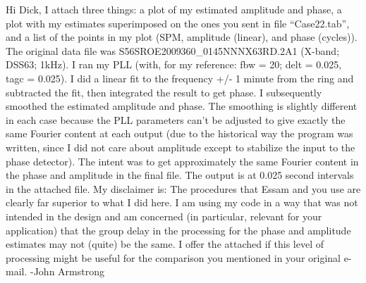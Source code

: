 \documentclass[crop=false,class=article,oneside]{standalone}
\begin{document}
Hi Dick, I attach three things:  a plot of my estimated amplitude and phase, a plot with my estimates superimposed on the ones you sent in file “Case22.tab”, and a list of the points in my plot (SPM, amplitude (linear), and phase (cycles)).  The original data file was S56SROE2009360\_0145NNNX63RD.2A1 (X-band; DSS63; 1kHz). I ran my PLL (with, for my reference: fbw = 20; delt = 0.025, tagc = 0.025). I did a linear fit to the frequency +/- 1 minute from the ring and subtracted the fit, then integrated the result to get phase.  I subsequently smoothed the estimated amplitude and phase.  The smoothing is slightly different in each case because the PLL parameters can’t be adjusted to give exactly the same Fourier content at each output (due to the historical way the program was written, since I did not care about amplitude except to stabilize the input to the phase detector).   The intent was to get approximately the same Fourier content in the phase and amplitude in the final file. The output is at 0.025 second intervals in the attached file. My disclaimer is:  The procedures that Essam and you use are clearly far superior to what I did here.  I am using my code in a way that was not intended in the design and am concerned (in particular, relevant for your application) that the group delay in the processing for the phase and amplitude estimates may not (quite) be the same.  I offer the attached if this level of processing might be useful for the comparison you mentioned in your original e-mail. -John Armstrong
\end{document}

